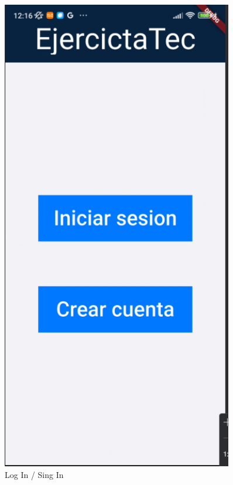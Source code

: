 \begin{figure}[H]
   \centering
   \begin{minipage}{0.45\textwidth}
      \centering
      \includegraphics[width=0.9\textwidth]{pantallas/LogSingIn.png}
      \caption{Log In / Sing In}
      \label{fig:LogSingIn}
   \end{minipage}%
   \hspace{0.5cm}
   \begin{minipage}{0.45\textwidth}

\end{minipage}
\end{figure}
